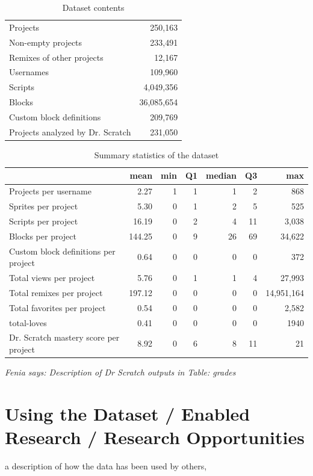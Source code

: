 \documentclass[10pt, conference]{IEEEtran}
\newcommand{\fenia}[1]{\emph{\color{blue}Fenia says: #1}}
\begin{document}
\begin{table}[ht]
	\centering
	\begin{tabular}{lr}
		\hline
		Projects & 250,163 \\
		Non-empty projects & 233,491 \\
		Remixes of other projects & 12,167 \\
		Usernames & 109,960 \\
		Scripts & 4,049,356 \\
		Blocks & 36,085,654 \\
		Custom block definitions & 209,769 \\
		Projects analyzed by Dr. Scratch & 231,050 \\
		\hline
	\end{tabular}
	\caption{Dataset contents}
	\label{tbl-size}
\end{table}

\begin{table}[ht]
	\centering
	\begin{tabular}{lrrrrrr}
		&\textbf{mean}&\textbf{min}&\textbf{Q1}&\textbf{median}&\textbf{Q3}&\textbf{max}\\
		\hline
			Projects per username&2.27&1&1&1&2&868\\
			Sprites per project&5.30&0&1&2&5&525\\
			Scripts per project&16.19&0&2&4&11&3,038\\
			Blocks per project&144.25&0&9&26&69&34,622\\
			Custom block definitions per project&0.64&0&0&0&0&372\\
			Total views per project&5.76&0&1&1&4&27,993\\
			Total remixes per project&197.12&0&0&0&0&14,951,164\\
			Total favorites per project&0.54&0&0&0&0&2,582\\
			total-loves&0.41&0&0&0&0&1940\\
			Dr. Scratch mastery score per project&8.92&0&6&8&11&21\\
		\hline
	\end{tabular}
	\caption{Summary statistics of the dataset}
	\label{tbl-stats}
\end{table}

\fenia{Description of Dr Scratch outputs in Table: grades}

\section{Using the Dataset / Enabled Research / Research Opportunities}
a description of how the data has been used by others,
\end{document}
